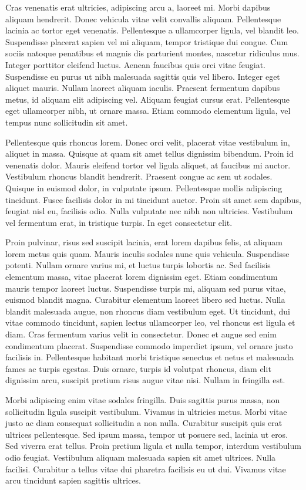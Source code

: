 Cras venenatis erat ultricies, adipiscing arcu a, laoreet mi. Morbi dapibus aliquam hendrerit. Donec vehicula vitae velit convallis aliquam. Pellentesque lacinia ac tortor eget venenatis. Pellentesque a ullamcorper ligula, vel blandit leo. Suspendisse placerat sapien vel mi aliquam, tempor tristique dui congue. Cum sociis natoque penatibus et magnis dis parturient montes, nascetur ridiculus mus. Integer porttitor eleifend luctus. Aenean faucibus quis orci vitae feugiat. Suspendisse eu purus ut nibh malesuada sagittis quis vel libero. Integer eget aliquet mauris. Nullam laoreet aliquam iaculis. Praesent fermentum dapibus metus, id aliquam elit adipiscing vel. Aliquam feugiat cursus erat. Pellentesque eget ullamcorper nibh, ut ornare massa. Etiam commodo elementum ligula, vel tempus nunc sollicitudin sit amet.

Pellentesque quis rhoncus lorem. Donec orci velit, placerat vitae vestibulum in, aliquet in massa. Quisque at quam sit amet tellus dignissim bibendum. Proin id venenatis dolor. Mauris eleifend tortor vel ligula aliquet, at faucibus mi auctor. Vestibulum rhoncus blandit hendrerit. Praesent congue ac sem ut sodales. Quisque in euismod dolor, in vulputate ipsum. Pellentesque mollis adipiscing tincidunt. Fusce facilisis dolor in mi tincidunt auctor. Proin sit amet sem dapibus, feugiat nisl eu, facilisis odio. Nulla vulputate nec nibh non ultricies. Vestibulum vel fermentum erat, in tristique turpis. In eget consectetur elit.

Proin pulvinar, risus sed suscipit lacinia, erat lorem dapibus felis, at aliquam lorem metus quis quam. Mauris iaculis sodales nunc quis vehicula. Suspendisse potenti. Nullam ornare varius mi, et luctus turpis lobortis ac. Sed facilisis elementum massa, vitae placerat lorem dignissim eget. Etiam condimentum mauris tempor laoreet luctus. Suspendisse turpis mi, aliquam sed purus vitae, euismod blandit magna. Curabitur elementum laoreet libero sed luctus. Nulla blandit malesuada augue, non rhoncus diam vestibulum eget. Ut tincidunt, dui vitae commodo tincidunt, sapien lectus ullamcorper leo, vel rhoncus est ligula et diam. Cras fermentum varius velit in consectetur. Donec et augue sed enim condimentum placerat. Suspendisse commodo imperdiet ipsum, vel ornare justo facilisis in. Pellentesque habitant morbi tristique senectus et netus et malesuada fames ac turpis egestas. Duis ornare, turpis id volutpat rhoncus, diam elit dignissim arcu, suscipit pretium risus augue vitae nisi. Nullam in fringilla est.

Morbi adipiscing enim vitae sodales fringilla. Duis sagittis purus massa, non sollicitudin ligula suscipit vestibulum. Vivamus in ultricies metus. Morbi vitae justo ac diam consequat sollicitudin a non nulla. Curabitur suscipit quis erat ultrices pellentesque. Sed ipsum massa, tempor ut posuere sed, lacinia ut eros. Sed viverra erat tellus. Proin pretium ligula et nulla tempor, interdum vestibulum odio feugiat. Vestibulum aliquam malesuada sapien sit amet ultrices. Nulla facilisi. Curabitur a tellus vitae dui pharetra facilisis eu ut dui. Vivamus vitae arcu tincidunt sapien sagittis ultrices. 

